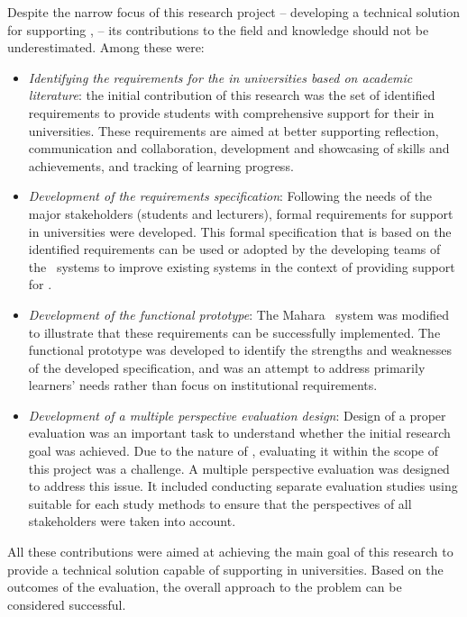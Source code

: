 Despite the narrow focus of this research project -- developing a technical
solution for supporting \LLLsn, -- its contributions to the field and knowledge
should not be underestimated. Among these were:
\begin{itemize}
  \item \textit{Identifying the requirements for the \LLLs in universities based
  on academic literature}: the initial contribution of this research was the set
  of identified requirements to provide students with comprehensive support for
  their \LLLs in universities. These requirements are aimed at better supporting
  reflection, communication and collaboration, development and showcasing of
  skills and achievements, and tracking of learning progress.
  
  \item \textit{Development of the requirements specification}: Following the
  needs of the major stakeholders (students and lecturers), formal requirements
  for \LLLs support in universities were developed. This formal specification
  that is based on the identified requirements can be used or adopted by the
  developing teams of the \ep~systems to improve existing systems in the context
  of providing support for \LLLsn.
  
  \item \textit{Development of the functional prototype}: The Mahara \ep~system
  was modified to illustrate that these requirements can be successfully
  implemented. The functional prototype was developed to identify the strengths
  and weaknesses of the developed specification, and was an attempt to address
  primarily learners' needs rather than focus on institutional requirements.
  
  \item \textit{Development of a multiple perspective evaluation design}: Design
  of a proper evaluation was an important task to understand whether the initial
  research goal was achieved. Due to the nature of \LLLsn, evaluating it within
  the scope of this project was a challenge. A multiple perspective evaluation
  was designed to address this issue. It included conducting separate evaluation
  studies using suitable for each study methods to ensure that the perspectives
  of all stakeholders were taken into account. 
\end{itemize}

All these contributions were aimed at achieving the main goal of this research
to provide a technical solution capable of supporting \LLLs in universities.
Based on the outcomes of the evaluation, the overall approach to the problem can
be considered successful.

